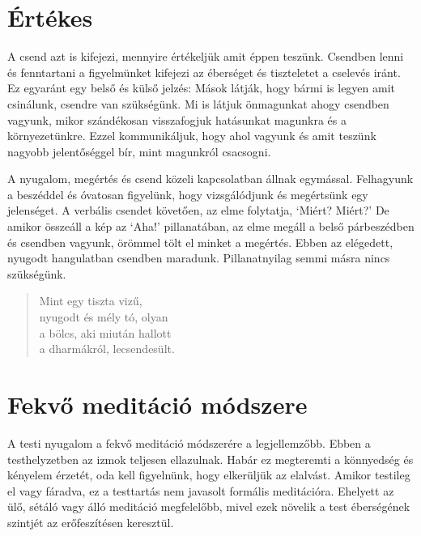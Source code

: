 \section{Értékes}


\noindent A csend azt is kifejezi, mennyire értékeljük amit éppen
teszünk. Csendben lenni és fenntartani a figyelmünket kifejezi az
éberséget és tiszteletet a cselevés iránt. Ez egyaránt egy belső és
külső jelzés: Mások látják, hogy bármi is legyen amit csinálunk, csendre
van szükségünk. Mi is látjuk önmagunkat ahogy csendben vagyunk, mikor
szándékosan visszafogjuk hatásunkat magunkra és a környezetünkre. Ezzel
kommunikáljuk, hogy ahol vagyunk és amit teszünk nagyobb jelentőséggel
bír, mint magunkról csacsogni.

A nyugalom, megértés és csend közeli kapcsolatban állnak egymással.
Felhagyunk a beszéddel és óvatosan figyelünk, hogy vizsgálódjunk és
megértsünk egy jelenséget. A verbális csendet követően, az elme
folytatja, `Miért? Miért?' De amikor összeáll a kép az `Aha!'
pillanatában, az elme megáll a belső párbeszédben és csendben vagyunk,
örömmel tölt el minket a megértés. Ebben az elégedett, nyugodt
hangulatban csendben maradunk. Pillanatnyilag semmi másra nincs
szükségünk.

\begin{quote}
Mint egy tiszta vizű,\\
nyugodt és mély tó, olyan\\
a bölcs, aki miután hallott\\
a dharmákról, lecsendesült.

\bigskip

\end{quote}

\section{Fekvő meditáció módszere}

\noindent A testi nyugalom a fekvő meditáció módszerére a legjellemzőbb.
Ebben a testhelyzetben az izmok teljesen ellazulnak. Habár ez megteremti
a könnyedség és kényelem érzetét, oda kell figyelnünk, hogy elkerüljük
az elalvást. Amikor testileg el vagy fáradva, ez a testtartás nem
javasolt formális meditációra. Ehelyett az ülő, sétáló vagy álló
meditáció megfelelőbb, mivel ezek növelik a test éberségének szintjét az
erőfeszítésen keresztül.

